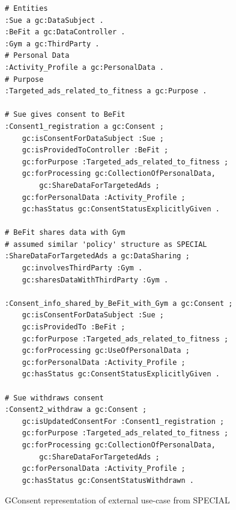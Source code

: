 \begin{listing}[htbp]
\begin{verbatim}
# Entities
:Sue a gc:DataSubject .
:BeFit a gc:DataController .
:Gym a gc:ThirdParty .
# Personal Data
:Activity_Profile a gc:PersonalData .
# Purpose
:Targeted_ads_related_to_fitness a gc:Purpose .

# Sue gives consent to BeFit
:Consent1_registration a gc:Consent ;
	gc:isConsentForDataSubject :Sue ;
	gc:isProvidedToController :BeFit ;
	gc:forPurpose :Targeted_ads_related_to_fitness ;
	gc:forProcessing gc:CollectionOfPersonalData, 
		gc:ShareDataForTargetedAds ;
	gc:forPersonalData :Activity_Profile ;
	gc:hasStatus gc:ConsentStatusExplicitlyGiven .

# BeFit shares data with Gym 
# assumed similar 'policy' structure as SPECIAL
:ShareDataForTargetedAds a gc:DataSharing ;
	gc:involvesThirdParty :Gym .
	gc:sharesDataWithThirdParty :Gym .

:Consent_info_shared_by_BeFit_with_Gym a gc:Consent ;
	gc:isConsentForDataSubject :Sue ;
	gc:isProvidedTo :BeFit ;
	gc:forPurpose :Targeted_ads_related_to_fitness ;
	gc:forProcessing gc:UseOfPersonalData ;
	gc:forPersonalData :Activity_Profile ;
	gc:hasStatus gc:ConsentStatusExplicitlyGiven .	

# Sue withdraws consent
:Consent2_withdraw a gc:Consent ;
	gc:isUpdatedConsentFor :Consent1_registration ;
	gc:forPurpose :Targeted_ads_related_to_fitness ;
	gc:forProcessing gc:CollectionOfPersonalData, 
		gc:ShareDataForTargetedAds ;
	gc:forPersonalData :Activity_Profile ;
	gc:hasStatus gc:ConsentStatusWithdrawn .

\end{verbatim}
\caption{GConsent representation of external use-case from SPECIAL}
\label{code:gconsent:use-case:special}
\end{listing}
